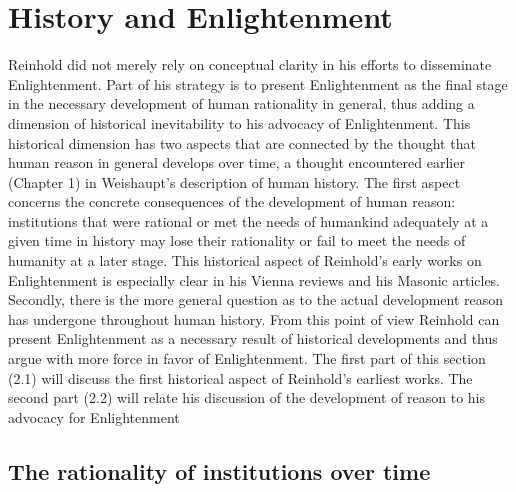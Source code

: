 \section{History and Enlightenment}


Reinhold did not merely rely on conceptual clarity in his efforts to disseminate Enlightenment. Part of his strategy is to present Enlightenment as the final stage in the necessary development of human rationality in general, thus adding a dimension of historical inevitability to his advocacy of Enlightenment. This historical dimension has two aspects that are connected by the thought that human reason in general develops over time, a thought encountered earlier (Chapter 1) in Weishaupt's description of human history. The first aspect concerns the concrete consequences of the development of human reason: institutions that were rational or met the needs of humankind adequately at a given time in history may lose their rationality or fail to meet the needs of humanity at a later stage. This historical aspect of Reinhold's early works on Enlightenment is especially clear in his Vienna reviews and his Masonic articles. Secondly, there is the more general question as to the actual development reason has undergone throughout human history. From this point of view Reinhold can present Enlightenment as a necessary result of historical developments and thus argue with more force in favor of Enlightenment. The first part of this section (2.1) will discuss the first historical aspect of Reinhold's earliest works. The second part (2.2) will relate his discussion of the development of reason to his advocacy for Enlightenment


\subsection{The rationality of institutions over time}



